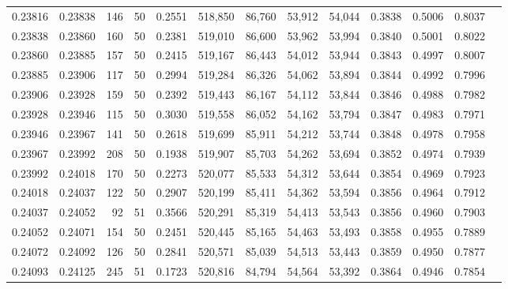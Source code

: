 \begin{tabular}{rrrrrrrrrrrrr}
0.23816 & 0.23838 &   146 &  50 &                                     0.2551 & 518,850 &  86,760 &  53,912 &  54,044 & 0.3838 & 0.5006 & 0.8037 \\
0.23838 & 0.23860 &   160 &  50 &                                     0.2381 & 519,010 &  86,600 &  53,962 &  53,994 & 0.3840 & 0.5001 & 0.8022 \\
0.23860 & 0.23885 &   157 &  50 &                                     0.2415 & 519,167 &  86,443 &  54,012 &  53,944 & 0.3843 & 0.4997 & 0.8007 \\
0.23885 & 0.23906 &   117 &  50 &                                     0.2994 & 519,284 &  86,326 &  54,062 &  53,894 & 0.3844 & 0.4992 & 0.7996 \\
0.23906 & 0.23928 &   159 &  50 &                                     0.2392 & 519,443 &  86,167 &  54,112 &  53,844 & 0.3846 & 0.4988 & 0.7982 \\
0.23928 & 0.23946 &   115 &  50 &                                     0.3030 & 519,558 &  86,052 &  54,162 &  53,794 & 0.3847 & 0.4983 & 0.7971 \\
0.23946 & 0.23967 &   141 &  50 &                                     0.2618 & 519,699 &  85,911 &  54,212 &  53,744 & 0.3848 & 0.4978 & 0.7958 \\
0.23967 & 0.23992 &   208 &  50 &                                     0.1938 & 519,907 &  85,703 &  54,262 &  53,694 & 0.3852 & 0.4974 & 0.7939 \\
0.23992 & 0.24018 &   170 &  50 &                                     0.2273 & 520,077 &  85,533 &  54,312 &  53,644 & 0.3854 & 0.4969 & 0.7923 \\
0.24018 & 0.24037 &   122 &  50 &                                     0.2907 & 520,199 &  85,411 &  54,362 &  53,594 & 0.3856 & 0.4964 & 0.7912 \\
0.24037 & 0.24052 &    92 &  51 &                                     0.3566 & 520,291 &  85,319 &  54,413 &  53,543 & 0.3856 & 0.4960 & 0.7903 \\
0.24052 & 0.24071 &   154 &  50 &                                     0.2451 & 520,445 &  85,165 &  54,463 &  53,493 & 0.3858 & 0.4955 & 0.7889 \\
0.24072 & 0.24092 &   126 &  50 &                                     0.2841 & 520,571 &  85,039 &  54,513 &  53,443 & 0.3859 & 0.4950 & 0.7877 \\
0.24093 & 0.24125 &   245 &  51 &                                     0.1723 & 520,816 &  84,794 &  54,564 &  53,392 & 0.3864 & 0.4946 & 0.7854 \\

\end{tabular}
